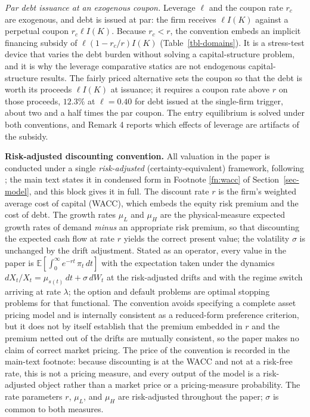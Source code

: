 \documentclass[
  11pt,
  letterpaper,
]{scrartcl}
\begin{document}
\emph{Par debt issuance at an exogenous coupon.} Leverage \(\ell\) and
the coupon rate \(r_c\) are exogenous, and debt is issued at par: the
firm receives \(\ell I(K)\) against a perpetual coupon
\(r_c \ell I(K)\). Because \(r_c < r\), the convention embeds an
implicit financing subsidy of \(\ell(1 - r_c/r) I(K)\)
(Table~\ref{tbl-domains}). It is a stress-test device that varies the
debt burden without solving a capital-structure problem, and it is why
the leverage comparative statics are not endogenous capital-structure
results. The fairly priced alternative sets the coupon so that the debt
is worth its proceeds \(\ell I(K)\) at issuance; it requires a coupon
rate above \(r\) on those proceeds, \(12.3\%\) at \(\ell = 0.40\) for
debt issued at the single-firm trigger, about two and a half times the
par coupon. The entry equilibrium is solved under both conventions, and
Remark 4 reports which effects of leverage are artifacts of the subsidy.

\textbf{Risk-adjusted discounting convention.} All valuation in the
paper is conducted under a single \emph{risk-adjusted}
(certainty-equivalent) framework, following \citet[Chapter
4]{dixit1994investment}; the main text states it in condensed form in
{Footnote \ref{fn:wacc}} of Section~\ref{sec-model}, and this block
gives it in full. The discount rate \(r\) is the firm's weighted average
cost of capital (WACC), which embeds the equity risk premium and the
cost of debt. The growth rates \(\mu_L\) and \(\mu_H\) are the
physical-measure expected growth rates of demand \emph{minus} an
appropriate risk premium, so that discounting the expected cash flow at
rate \(r\) yields the correct present value; the volatility \(\sigma\)
is unchanged by the drift adjustment. Stated as an operator, every value
in the paper is \(\mathbb{E}[\int_0^\infty e^{-rt}\,\pi_t\,dt]\) with
the expectation taken under the dynamics
\(dX_t/X_t = \mu_{s(t)}\,dt + \sigma\,dW_t\) at the risk-adjusted drifts
and with the regime switch arriving at rate \(\lambda\); the option and
default problems are optimal stopping problems for that functional. The
convention avoids specifying a complete asset pricing model and is
internally consistent as a reduced-form preference criterion, but it
does not by itself establish that the premium embedded in \(r\) and the
premium netted out of the drifts are mutually consistent, so the paper
makes no claim of correct market pricing. The price of the convention is
recorded in the main-text footnote: because discounting is at the WACC
and not at a risk-free rate, this is not a pricing measure, and every
output of the model is a risk-adjusted object rather than a market price
or a pricing-measure probability. The rate parameters \(r\), \(\mu_L\),
and \(\mu_H\) are risk-adjusted throughout the paper; \(\sigma\) is
common to both measures.
\end{document}
